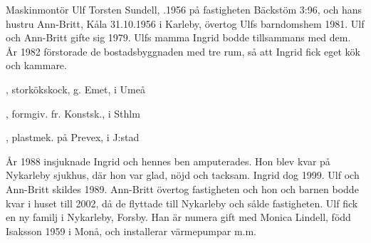Maskinmontör Ulf Torsten Sundell, .1956 på fastigheten Bäckstöm 3:96, och hans hustru Ann-Britt, \textborn Kåla 31.10.1956 i Karleby, övertog Ulfs barndomshem 1981. Ulf och Ann-Britt gifte sig 1979. Ulfs mamma Ingrid bodde tillsammans med dem. År 1982 förstorade de bostadsbyggnaden med tre rum, så att Ingrid fick eget kök och kammare.
\begin{jhchildren}
  \item {}, storkökskock, g. Emet, i Umeå
  \item {}, formgiv. fr. Konstsk., i Sthlm
  \item {}, plastmek. på Prevex, i J:stad
\end{jhchildren}

År 1988 insjuknade Ingrid och hennes ben amputerades. Hon blev kvar på Nykarleby sjukhus, där hon var glad, nöjd och tacksam. Ingrid dog 	1999. Ulf och Ann-Britt skildes 1989. Ann-Britt övertog fastigheten och	hon och barnen bodde kvar i huset till 2002, då de flyttade till Nykarleby och sålde fastigheten. Ulf fick en ny familj i Nykarleby, Forsby. Han är numera gift med Monica Lindell, född Isaksson 1959 i Monå, och installerar värmepumpar m.m.


\jhvspace{}


